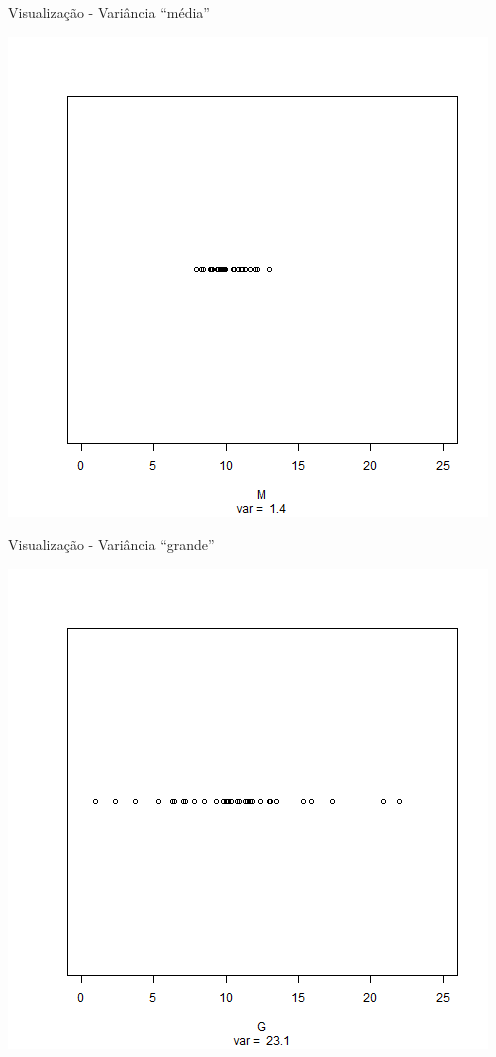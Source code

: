 \documentclass{beamer}
\begin{document}
\begin{frame}{Visualização - Variância ``média''}
  \begin{center}
    \includegraphics[height=.8\textheight]{Cap17/dot-M}
  \end{center}
\end{frame}

\begin{frame}{Visualização - Variância ``grande''}
  \begin{center}
    \includegraphics[height=.8\textheight]{Cap17/dot-G}
  \end{center}
\end{frame}
\end{document}
